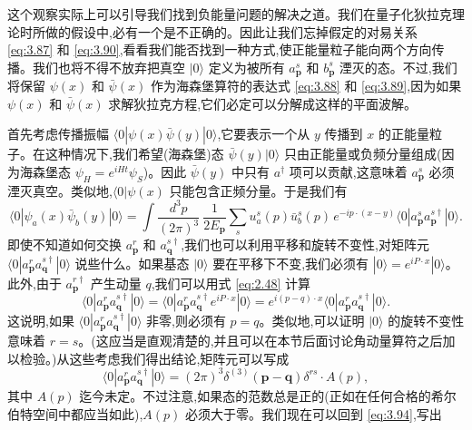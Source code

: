 这个观察实际上可以引导我们找到负能量问题的解决之道。我们在量子化狄拉克理论时所做的假设中,必有一个是不正确的。因此让我们忘掉假定的对易关系 \eqref{eq:3.87} 和 \eqref{eq:3.90},看看我们能否找到一种方式,使正能量粒子能向两个方向传播。我们也将不得不放弃把真空 $|0\rangle$ 定义为被所有 $a_{\mathbf{p}}^s$ 和 $b_{\mathbf{p}}^s$ 湮灭的态。不过,我们将保留 $\psi(x)$ 和 $\bar{\psi}(x)$ 作为海森堡算符的表达式 \eqref{eq:3.88} 和 \eqref{eq:3.89},因为如果 $\psi(x)$ 和 $\bar{\psi}(x)$ 求解狄拉克方程,它们必定可以分解成这样的平面波解。

首先考虑传播振幅 $\langle 0|\psi(x)\bar{\psi}(y)|0\rangle$,它要表示一个从 $y$ 传播到 $x$ 的正能量粒子。在这种情况下,我们希望(海森堡)态 $\bar{\psi}(y)|0\rangle$ 只由正能量或负频分量组成(因为海森堡态 $\psi_H = e^{iHt}\psi_S$)。因此 $\bar{\psi}(y)$ 中只有 $a^\dagger$ 项可以贡献,这意味着 $a_{\mathbf{p}}^s$ 必须湮灭真空。类似地,$\langle 0|\psi(x)$ 只能包含正频分量。于是我们有
\begin{equation}
  \langle 0|\psi_a(x)\bar{\psi}_b(y)|0\rangle
    = \int \frac{d^3p}{(2\pi)^3}\ \frac{1}{2E_{\mathbf{p}}}
    \sum_s u_a^s(p)\bar{u}_b^s(p)\, e^{-ip\cdot(x-y)}
    \langle 0|a_{\mathbf{p}}^s a_{\mathbf{p}}^{s\dagger}|0\rangle .
  \label{eq:3.94}
\end{equation}
即使不知道如何交换 $a_{\mathbf{p}}^r$ 和 $a_{\mathbf{q}}^{s\dagger}$,我们也可以利用平移和旋转不变性,对矩阵元 $\langle 0|a_{\mathbf{p}}^r a_{\mathbf{q}}^{s\dagger}|0\rangle$ 说些什么。如果基态 $|0\rangle$ 要在平移下不变,我们必须有
$|0\rangle = e^{iP\cdot x}|0\rangle$。此外,由于 $a_{\mathbf{p}}^{r\dagger}$ 产生动量 $q$,我们可以用式 \eqref{eq:2.48} 计算
\begin{equation}
  \langle 0|a_{\mathbf{p}}^r a_{\mathbf{q}}^{s\dagger}|0\rangle
    = \langle 0|a_{\mathbf{p}}^r a_{\mathbf{q}}^{s\dagger}
      e^{iP\cdot x}|0\rangle
    = e^{i(p-q)\cdot x}\langle 0|a_{\mathbf{p}}^r a_{\mathbf{q}}^{s\dagger}|0\rangle .
\end{equation}
这说明,如果 $\langle 0|a_{\mathbf{p}}^r a_{\mathbf{q}}^{s\dagger}|0\rangle$ 非零,则必须有 $p = q$。类似地,可以证明 $|0\rangle$ 的旋转不变性意味着 $r = s$。(这应当是直观清楚的,并且可以在本节后面讨论角动量算符之后加以检验。)从这些考虑我们得出结论,矩阵元可以写成
\begin{equation}
  \langle 0|a_{\mathbf{p}}^r a_{\mathbf{q}}^{s\dagger}|0\rangle
    = (2\pi)^3\delta^{(3)}(\mathbf{p}-\mathbf{q})\delta^{rs} \cdot A(p),
\end{equation}
其中 $A(p)$ 迄今未定。不过注意,如果态的范数总是正的(正如在任何合格的希尔伯特空间中都应当如此),$A(p)$ 必须大于零。我们现在可以回到 \eqref{eq:3.94},写出
